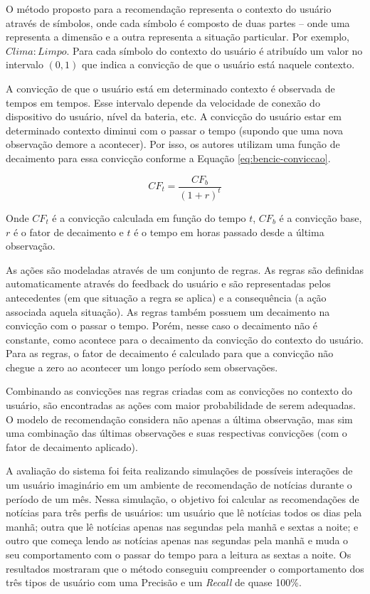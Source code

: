 O método proposto para a recomendação representa o contexto do usuário através de símbolos, onde cada símbolo é
composto de duas partes – onde uma representa a dimensão e a outra representa a situação particular. Por exemplo,
$Clima:Limpo$. Para cada símbolo do contexto do usuário é atribuído um valor no intervalo $(0, 1)$ que indica a convicção
de que o usuário está naquele contexto.

A convicção de que o usuário está em determinado contexto é observada de tempos em tempos. Esse intervalo depende da
velocidade de conexão do dispositivo do usuário, nível da bateria, etc. A convicção do usuário estar em determinado
contexto diminui com o passar o tempo (supondo que uma nova observação demore a acontecer). Por isso, os autores
utilizam uma função de decaimento para essa convicção conforme a Equação \ref{eq:bencic-conviccao}.

\begin{equation}
  \label{eq:bencic-conviccao}
  CF_t = \frac{CF_b}{(1+r)^t}
\end{equation}

Onde $CF_t$ é a convicção calculada em função do tempo $t$, $CF_b$ é a convicção base, $r$ é o fator de decaimento e $t$
é o tempo em horas passado desde a última observação.

As ações são modeladas através de um conjunto de regras. As regras são definidas automaticamente através do feedback do
usuário e são representadas pelos antecedentes (em que situação a regra se aplica) e a consequência (a ação associada
aquela situação). As regras também possuem um decaimento na convicção com o passar o tempo. Porém, nesse caso o
decaimento não é constante, como acontece para o decaimento da convicção do contexto do usuário. Para as regras, o fator
de decaimento é calculado para que a convicção não chegue a zero ao acontecer um longo período sem observações.

Combinando as convicções nas regras criadas com as convicções no contexto do usuário, são encontradas as ações com
maior probabilidade de serem adequadas. O modelo de recomendação considera não apenas a última observação, mas sim uma
combinação das últimas observações e suas respectivas convicções (com o fator de decaimento aplicado).

A avaliação do sistema foi feita realizando simulações de possíveis interações de um usuário imaginário em um ambiente
de recomendação de notícias durante o período de um mês. Nessa simulação, o objetivo foi calcular as recomendações de
notícias para três perfis de usuários: um usuário que lê notícias todos os dias pela manhã; outra que lê notícias apenas
nas segundas pela manhã e sextas a noite; e outro que começa lendo as notícias apenas nas segundas pela manhã e muda o
seu comportamento com o passar do tempo para a leitura as sextas a noite. Os resultados mostraram que o método conseguiu
compreender o comportamento dos três tipos de usuário com uma Precisão e um \textit{Recall} de quase 100\%.

